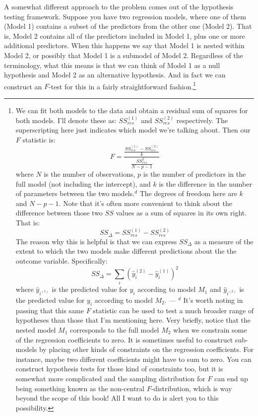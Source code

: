 \documentclass[
  a4paper,
]{book}
\begin{document}
A somewhat different approach to the problem comes out of the hypothesis
testing framework. Suppose you have two regression models, where one of
them (Model 1) contains a subset of the predictors from the other one
(Model 2). That is, Model 2 contains all of the predictors included in
Model 1, plus one or more additional predictors. When this happens we
say that Model 1 is nested within Model 2, or possibly that Model 1 is a
submodel of Model 2. Regardless of the terminology, what this means is
that we can think of Model 1 as a null hypothesis and Model 2 as an
alternative hypothesis. And in fact we can construct an \(F\)-test for
this in a fairly straightforward fashion.\footnote{We can fit both
  models to the data and obtain a residual sum of squares for both
  models. I'll denote these as: \(SS_{res}^{(1)}\) and
  \(SS_{res}^{(2)}\) respectively. The superscripting here just
  indicates which model we're talking about. Then our \(F\) statistic
  is:
  \[F= \frac {\frac {SS _{res}^{(1)} - SS_{res}^{(2)}} {k}}   {\frac{SS_{res}^2} {N-p-1} }\]
  where \(N\) is the number of observations, \(p\) is the number of
  predictors in the full model (not including the intercept), and \(k\)
  is the difference in the number of parameters between the two
  models.\(^d\) The degrees of freedom here are \(k\) and \(N -p-1\).
  Note that it's often more convenient to think about the difference
  between those two \(SS\) values as a sum of squares in its own right.
  That is: \[SS_\Delta=SS_{res}^{(1)}-SS_{res}^{(2)}\] The reason why
  this is helpful is that we can express \(SS_\Delta\) as a measure of
  the extent to which the two models make different predictions about
  the the outcome variable. Specifically:
  \[SS_\Delta=\sum_i{(\hat{y}_i^{(2)}-\hat{y}_i^{(1)})^2}\] where
  \(\hat{y}_{i^{(1)}}\) is the predicted value for \(y_i\) according to
  model \(M_1\) and \(\hat{y}_{i^{(2)}}\) is the predicted value for
  \(y_i\) according to model \(M_2\). --- \(^d\) It's worth noting in
  passing that this same \(F\) statistic can be used to test a much
  broader range of hypotheses than those that I'm mentioning here. Very
  briefly, notice that the nested model \(M_1\) corresponds to the full
  model \(M_2\) when we constrain some of the regression coefficients to
  zero. It is sometimes useful to construct sub-models by placing other
  kinds of constraints on the regression coefficients. For instance,
  maybe two different coefficients might have to sum to zero. You can
  construct hypothesis tests for those kind of constraints too, but it
  is somewhat more complicated and the sampling distribution for \(F\)
  can end up being something known as the non-central
  \(F\)-distribution, which is way beyond the scope of this book! All I
  want to do is alert you to this possibility.}
\end{document}
